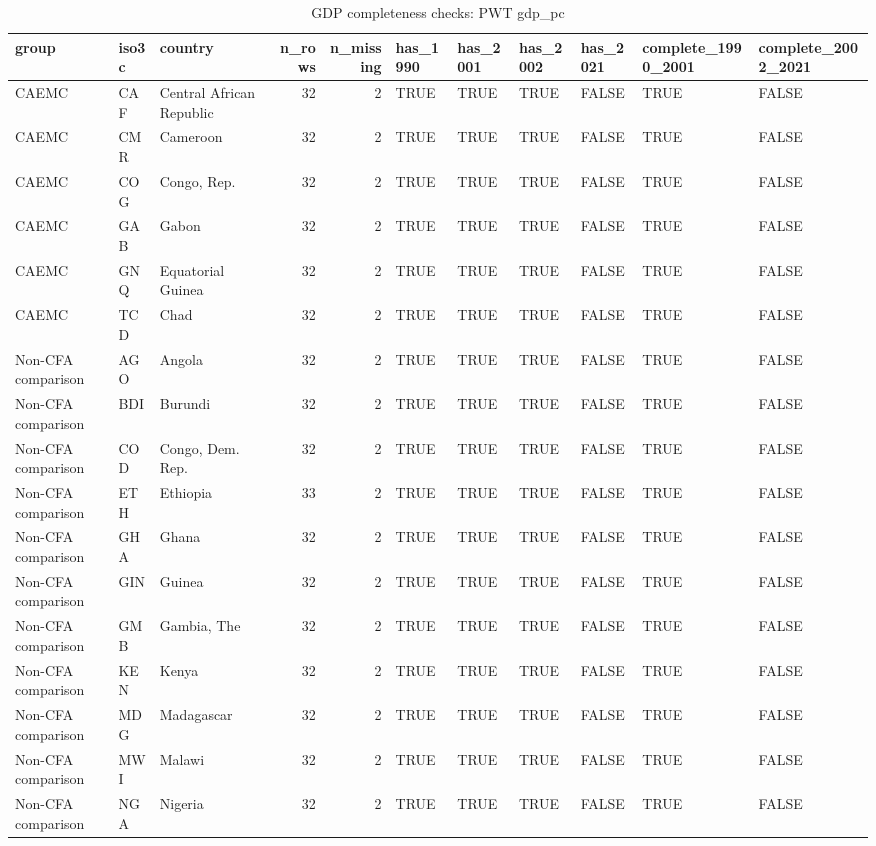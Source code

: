 \begin{table}

\caption{GDP completeness checks: PWT gdp_pc}
\centering
\begin{tabular}[t]{lllrrllllll}
\toprule
group & iso3c & country & n\_rows & n\_missing & has\_1990 & has\_2001 & has\_2002 & has\_2021 & complete\_1990\_2001 & complete\_2002\_2021\\
\midrule
CAEMC & CAF & Central African Republic & 32 & 2 & TRUE & TRUE & TRUE & FALSE & TRUE & FALSE\\
CAEMC & CMR & Cameroon & 32 & 2 & TRUE & TRUE & TRUE & FALSE & TRUE & FALSE\\
CAEMC & COG & Congo, Rep. & 32 & 2 & TRUE & TRUE & TRUE & FALSE & TRUE & FALSE\\
CAEMC & GAB & Gabon & 32 & 2 & TRUE & TRUE & TRUE & FALSE & TRUE & FALSE\\
CAEMC & GNQ & Equatorial Guinea & 32 & 2 & TRUE & TRUE & TRUE & FALSE & TRUE & FALSE\\
\addlinespace
CAEMC & TCD & Chad & 32 & 2 & TRUE & TRUE & TRUE & FALSE & TRUE & FALSE\\
Non-CFA comparison & AGO & Angola & 32 & 2 & TRUE & TRUE & TRUE & FALSE & TRUE & FALSE\\
Non-CFA comparison & BDI & Burundi & 32 & 2 & TRUE & TRUE & TRUE & FALSE & TRUE & FALSE\\
Non-CFA comparison & COD & Congo, Dem. Rep. & 32 & 2 & TRUE & TRUE & TRUE & FALSE & TRUE & FALSE\\
Non-CFA comparison & ETH & Ethiopia & 33 & 2 & TRUE & TRUE & TRUE & FALSE & TRUE & FALSE\\
\addlinespace
Non-CFA comparison & GHA & Ghana & 32 & 2 & TRUE & TRUE & TRUE & FALSE & TRUE & FALSE\\
Non-CFA comparison & GIN & Guinea & 32 & 2 & TRUE & TRUE & TRUE & FALSE & TRUE & FALSE\\
Non-CFA comparison & GMB & Gambia, The & 32 & 2 & TRUE & TRUE & TRUE & FALSE & TRUE & FALSE\\
Non-CFA comparison & KEN & Kenya & 32 & 2 & TRUE & TRUE & TRUE & FALSE & TRUE & FALSE\\
Non-CFA comparison & MDG & Madagascar & 32 & 2 & TRUE & TRUE & TRUE & FALSE & TRUE & FALSE\\
\addlinespace
Non-CFA comparison & MWI & Malawi & 32 & 2 & TRUE & TRUE & TRUE & FALSE & TRUE & FALSE\\
Non-CFA comparison & NGA & Nigeria & 32 & 2 & TRUE & TRUE & TRUE & FALSE & TRUE & FALSE\\

\end{tabular}
\end{table}
